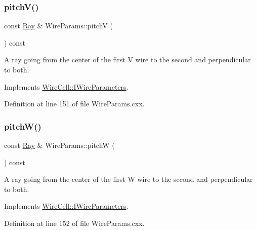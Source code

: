 \subsubsection{\texorpdfstring{pitch\+V()}{pitchV()}}
{\footnotesize\ttfamily const \hyperlink{namespace_wire_cell_a3ab20d9b438feb7eb1ffaab9ba98af0c}{Ray} \& Wire\+Params\+::pitchV (\begin{DoxyParamCaption}{ }\end{DoxyParamCaption}) const\hspace{0.3cm}{\ttfamily [virtual]}}

A ray going from the center of the first V wire to the second and perpendicular to both. 

Implements \hyperlink{class_wire_cell_1_1_i_wire_parameters_a696c827d971a57805da41e3f2f14ba35}{Wire\+Cell\+::\+I\+Wire\+Parameters}.



Definition at line 151 of file Wire\+Params.\+cxx.

\mbox{\label{class_wire_cell_1_1_wire_params_a8b310b4fe56d7c1eda061473ec86b5d0}} 
\subsubsection{\texorpdfstring{pitch\+W()}{pitchW()}}
{\footnotesize\ttfamily const \hyperlink{namespace_wire_cell_a3ab20d9b438feb7eb1ffaab9ba98af0c}{Ray} \& Wire\+Params\+::pitchW (\begin{DoxyParamCaption}{ }\end{DoxyParamCaption}) const\hspace{0.3cm}{\ttfamily [virtual]}}

A ray going from the center of the first W wire to the second and perpendicular to both. 

Implements \hyperlink{class_wire_cell_1_1_i_wire_parameters_a4e9d46ba775e642112628b79853b58cb}{Wire\+Cell\+::\+I\+Wire\+Parameters}.



Definition at line 152 of file Wire\+Params.\+cxx.

\mbox{\label{class_wire_cell_1_1_wire_params_a7ad51fcb64c9edae1695873f1bec86dc}} 
